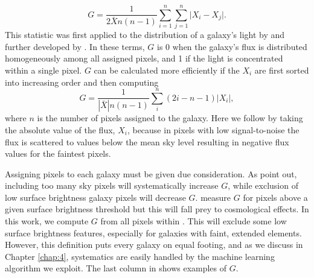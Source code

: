 \begin{equation}
G = \frac{1}{2\bar Xn(n-1)}\sum_{i=1}^n\sum_{j=1}^n\Big|X_i - X_j\Big|.
\end{equation}
This statistic was first applied to the distribution of a galaxy's light by \cite{Abraham2003} and further developed by \cite{Lotz2004}. In these terms, $G$ is 0 when the galaxy's flux is distributed homogeneously among all assigned pixels, and 1 if the light is concentrated within a single pixel. $G$ can be calculated more efficiently if the $X_i$ are first sorted into increasing order and then computing \citep{Glasser1962}
\begin{equation}
G = \frac{1}{|\bar X|n(n-1)}\sum_i^n(2i-n-1)|X_i|,
\end{equation}
where $n$ is the number of pixels assigned to the galaxy. Here we follow \cite{Lotz2004} by taking the absolute value of the flux, $X_i$, because in pixels with low signal-to-noise the flux is scattered to values below the mean sky level resulting in negative flux values for the faintest pixels. 

Assigning pixels to each galaxy must be given due consideration. As \cite{Lotz2004} point out, including too many sky pixels will systematically increase $G$, while exclusion of low surface brightness galaxy pixels will decrease $G$. \cite{Abraham2003} measure $G$ for pixels above a given surface brightness threshold but this will fall prey to cosmological effects. In this work, we compute $G$ from all pixels within \rp. This will exclude some low surface brightness features, especially for galaxies with faint, extended elements. However, this definition puts every galaxy on equal footing, and as we discuss in Chapter \ref{chap:4}, systematics are easily handled by the machine learning algorithm we exploit. The last column in  shows examples of $G$.


